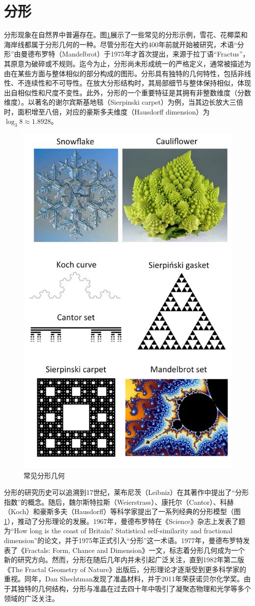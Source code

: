 \section{分形}
分形现象在自然界中普遍存在。图\ref{fig:CommonFtactal}展示了一些常见的分形示例，雪花、花椰菜和海岸线都属于分形几何的一种。尽管分形在大约400年前就开始被研究，术语“分形”由曼德布罗特（Mandelbrot）于1975年才首次提出\cite{mandelbrot1975fractals}，来源于拉丁语“Fractus”，其原意为破碎或不规则。迄今为止，分形尚未形成统一的严格定义，通常被描述为由在某些方面与整体相似的部分构成的图形。分形具有独特的几何特性，包括非线性、不连续性和不可导性。在放大分形结构时，其局部细节与整体保持相似，体现出自相似性和尺度不变性\cite{Mandelbrot1982}。此外，分形的一个重要特征是其拥有非整数维度（分数维度）。以著名的谢尔宾斯基地毯（Sierpinski carpet）为例，当其边长放大三倍时，面积增至八倍，对应的豪斯多夫维度（Hausdorff dimension）为 $\log_3 8 \approx 1.8928$。

\begin{figure}[htbp]
    \centering
    \includegraphics[width=0.5\linewidth]{figure/FractalTopo/CommonFtactal.png}
    \caption{常见分形几何}
    \label{fig:CommonFtactal}
\end{figure}

分形的研究历史可以追溯到17世纪，莱布尼茨（Leibniz）在其著作中提出了“分形指数”的概念。随后，魏尔斯特拉斯（Weierstrass）、康托尔（Cantor）、科赫（Koch）和豪斯多夫（Hausdorff）等科学家提出了一系列经典的分形模型（图\ref{fig:CommonFtactal}），推动了分形理论的发展。1967年，曼德布罗特在《Science》杂志上发表了题为“How long is the coast of Britain? Statistical self-similarity and fractional dimension”的论文\cite{mandelbrot1967coast}，并于1975年正式引入“分形”这一术语\cite{mandelbrot1975fractals}。1977年，曼德布罗特发表了《Fractals: Form, Chance and Dimension》一文\cite{mandelbrot1977fractals}，标志着分形几何成为一个新的研究方向。然而，分形在随后几年内并未引起广泛关注，直到1982年第二版《The Fractal Geometry of Nature》出版后\cite{Mandelbrot1982}，分形理论才逐渐受到更多科学家的重视。同年，Dan Shechtman发现了准晶材料\cite{shechtman1984metallic}，并于2011年荣获诺贝尔化学奖。由于其独特的几何结构，分形与准晶在过去四十年中吸引了凝聚态物理和光学等多个领域的广泛关注。


